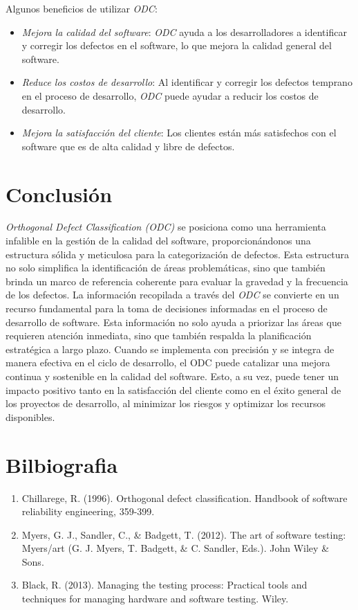 \documentclass{dense_template}
\begin{document}
Algunos beneficios de utilizar \textit{ODC}:
    \begin{itemize}
        \item \textit{Mejora la calidad del software}: \textit{ODC} ayuda a los desarrolladores a identificar y corregir los defectos en el software, lo que mejora la calidad general del software.
        \item \textit{Reduce los costos de desarrollo}: Al identificar y corregir los defectos temprano en el proceso de desarrollo, \textit{ODC} puede ayudar a reducir los costos de desarrollo.
        \item \textit{Mejora la satisfacción del cliente}: Los clientes están más satisfechos con el software que es de alta calidad y libre de defectos.
    \end{itemize}

\pagebreak
\section{Conclusión}
\textit{Orthogonal Defect Classification (ODC)} se posiciona como una herramienta infalible en la gestión de la calidad del software, proporcionándonos una estructura sólida y meticulosa para la categorización de defectos. Esta estructura no solo simplifica la identificación de áreas problemáticas, sino que también brinda un marco de referencia coherente para evaluar la gravedad y la frecuencia de los defectos. 
La información recopilada a través del \textit{ODC} se convierte en un recurso fundamental para la toma de decisiones informadas en el proceso de desarrollo de software. Esta información no solo ayuda a priorizar las áreas que requieren atención inmediata, sino que también respalda la planificación estratégica a largo plazo.
Cuando se implementa con precisión y se integra de manera efectiva en el ciclo de desarrollo, el ODC puede catalizar una mejora continua y sostenible en la calidad del software. Esto, a su vez, puede tener un impacto positivo tanto en la satisfacción del cliente como en el éxito general de los proyectos de desarrollo, al minimizar los riesgos y optimizar los recursos disponibles.
\pagebreak
\section{Bilbiografia}
\sloppy
\begin{enumerate}
    \item Chillarege, R. (1996). Orthogonal defect classification. Handbook of software reliability engineering, 359-399.
    \item Myers, G. J., Sandler, C., \& Badgett, T. (2012). The art of software testing: Myers/art (G. J. Myers, T. Badgett, \& C. Sandler, Eds.). John Wiley \& Sons.
    \item Black, R. (2013). Managing the testing process: Practical tools and techniques for managing hardware and software testing. Wiley.
\end{enumerate}
\end{document}
